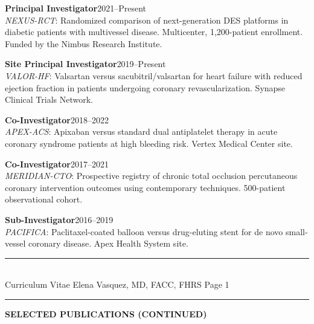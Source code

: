 \documentclass[11pt,a4paper]{article}
\newcommand{\cvsection}[1]{%
  \vspace{1.2em}%
  \noindent
  {\color{primary}\rule{3.5pt}{15pt}}\hspace{8pt}%
  {\color{primary}\Large\bfseries\MakeUppercase{#1}}%
  \vspace{0.2em}%
  \par\noindent{\color{primary!25}\rule{\textwidth}{0.5pt}}%
  \vspace{0.6em}%
}
\begin{document}
\vspace{-2pt}
{\color{darktext}
\noindent\textbf{\color{primary}Principal Investigator}\hfill 2021--Present\\
\textit{NEXUS-RCT}: Randomized comparison of next-generation DES platforms in diabetic patients with multivessel disease. Multicenter, 1,200-patient enrollment. Funded by the Nimbus Research Institute.

\vspace{4pt}
\noindent\textbf{\color{primary}Site Principal Investigator}\hfill 2019--Present\\
\textit{VALOR-HF}: Valsartan versus sacubitril/valsartan for heart failure with reduced ejection fraction in patients undergoing coronary revascularization. Synapse Clinical Trials Network.

\vspace{4pt}
\noindent\textbf{\color{primary}Co-Investigator}\hfill 2018--2022\\
\textit{APEX-ACS}: Apixaban versus standard dual antiplatelet therapy in acute coronary syndrome patients at high bleeding risk. Vertex Medical Center site.

\vspace{4pt}
\noindent\textbf{\color{primary}Co-Investigator}\hfill 2017--2021\\
\textit{MERIDIAN-CTO}: Prospective registry of chronic total occlusion percutaneous coronary intervention outcomes using contemporary techniques. 500-patient observational cohort.

\vspace{4pt}
\noindent\textbf{\color{primary}Sub-Investigator}\hfill 2016--2019\\
\textit{PACIFICA}: Paclitaxel-coated balloon versus drug-eluting stent for de novo small-vessel coronary disease. Apex Health System site.
}

\vfill
\begin{center}
{\color{primary!40}\rule{0.6\textwidth}{0.3pt}}\\[4pt]
{\color{primary!50}\footnotesize Curriculum Vitae \textbar{} Elena Vasquez, MD, FACC, FHRS \textbar{} Page 1}
\end{center}

\newpage
\pagestyle{cvpages}

\cvsection{Selected Publications (continued)}
\end{document}

